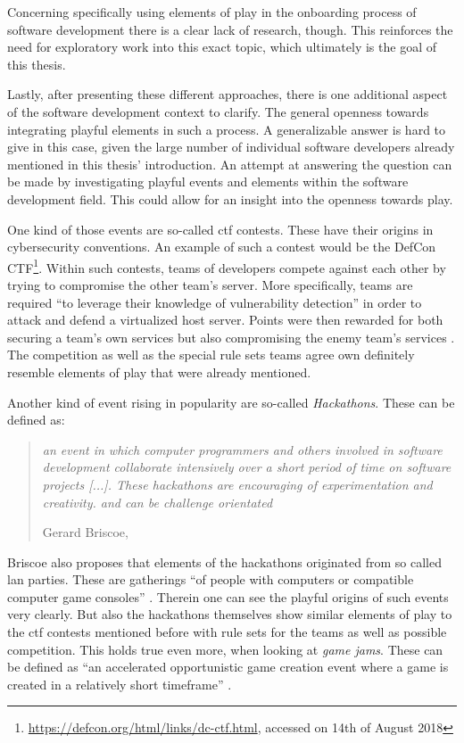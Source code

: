 Concerning specifically using elements of play in the onboarding process of software development there is a clear lack of research, though. This reinforces the need for exploratory work into this exact topic, which ultimately is the goal of this thesis.

Lastly, after presenting these different approaches, there is one additional aspect of the software development context to clarify. The general openness towards integrating playful elements in such a process. A generalizable answer is hard to give in this case, given the large number of individual software developers already mentioned in this thesis' introduction. An attempt at answering the question can be made by investigating playful events and elements within the software development field. This could allow for an insight into the openness towards play.

One kind of those events are so-called \gls{ctf} contests. These have their origins in cybersecurity conventions. An example of such a contest would be the DefCon CTF\footnote{\url{https://defcon.org/html/links/dc-ctf.html}, accessed on 14th of August 2018}. Within such contests, teams of developers compete against each other by trying to compromise the other team's server. More specifically, teams are required \enquote{to leverage their knowledge of vulnerability detection} \cite[p. 134]{childers2010organizing} in order to attack and defend a virtualized host server. Points were then rewarded for both securing a team's own services but also compromising the enemy team's services \cite[p. 132-135]{childers2010organizing}. The competition as well as the special rule sets teams agree own definitely resemble elements of play that were already mentioned.

Another kind of event rising in popularity are so-called \textit{Hackathons}. These can be defined as:

\begin{quote}
  \textit{an event in which computer programmers and others involved in software development collaborate intensively over a short period of time on software projects [...]. These hackathons are encouraging of experimentation and creativity. and can be challenge orientated}

  \footnotesize{Gerard Briscoe, \cite[p. 1]{briscoe2014digital}}
\end{quote}

Briscoe also proposes that elements of the hackathons originated from so called \gls{lan} parties. These are gatherings \enquote{of people with computers or compatible computer game consoles} \cite[p. 3]{briscoe2014digital}. Therein one can see the playful origins of such events very clearly. But also the hackathons themselves show similar elements of play to the \gls{ctf} contests mentioned before with rule sets for the teams as well as possible competition. This holds true even more, when looking at \textit{game jams}. These can be defined as \enquote{an accelerated opportunistic game creation event where a game is created in a relatively short timeframe} \cite{kultima2015defining}.

